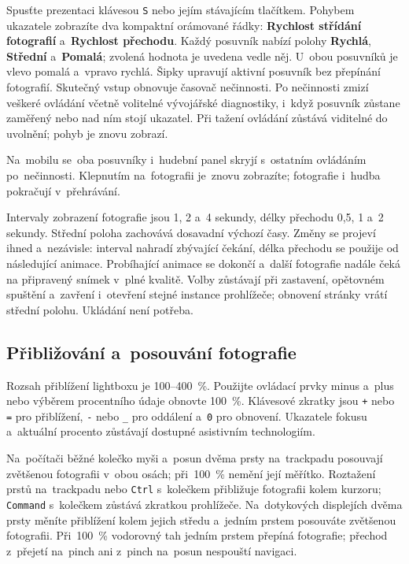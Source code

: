 \documentclass[11pt,a4paper]{article}
\newcommand{\ui}[1]{\textbf{#1}}
\newcommand{\codeword}[1]{\nolinkurl{#1}}
\begin{document}
Spusťte prezentaci klávesou \codeword{S} nebo jejím stávajícím tlačítkem.
Pohybem ukazatele zobrazíte dva kompaktní orámované řádky: \ui{Rychlost střídání
fotografií} a~\ui{Rychlost přechodu}. Každý posuvník nabízí polohy \ui{Rychlá},
\ui{Střední} a~\ui{Pomalá}; zvolená hodnota je uvedena vedle něj. U~obou
posuvníků je vlevo pomalá a~vpravo rychlá. Šipky upravují aktivní posuvník bez
přepínání fotografií. Skutečný vstup obnovuje časovač nečinnosti. Po nečinnosti
zmizí veškeré ovládání včetně volitelné vývojářské diagnostiky, i~když posuvník
zůstane zaměřený nebo nad ním stojí ukazatel. Při tažení ovládání zůstává
viditelné do uvolnění; pohyb je znovu zobrazí.

Na~mobilu se~oba posuvníky i~hudební panel skryjí s~ostatním ovládáním
po~nečinnosti. Klepnutím na~fotografii je~znovu zobrazíte; fotografie i~hudba
pokračují v~přehrávání.

Intervaly zobrazení fotografie jsou 1, 2 a~4 sekundy, délky přechodu 0,5, 1 a~2
sekundy. Střední poloha zachovává dosavadní výchozí časy. Změny se projeví ihned
a~nezávisle: interval nahradí zbývající čekání, délka přechodu se použije od
následující animace. Probíhající animace se dokončí a~další fotografie nadále
čeká na připravený snímek v~plné kvalitě. Volby zůstávají při zastavení,
opětovném spuštění a~zavření i~otevření stejné instance prohlížeče; obnovení
stránky vrátí střední polohu. Ukládání není potřeba.

\subsection{Přibližování a~posouvání fotografie}

Rozsah přiblížení lightboxu je 100--400~\%. Použijte ovládací prvky minus a~plus
nebo výběrem procentního údaje obnovte 100~\%. Klávesové zkratky jsou
\codeword{+} nebo \codeword{=} pro přiblížení, \codeword{-} nebo \codeword{\_}
pro oddálení a~\codeword{0} pro obnovení. Ukazatele fokusu a~aktuální procento
zůstávají dostupné asistivním technologiím.

Na~počítači běžné kolečko myši a~posun dvěma prsty na~trackpadu posouvají
zvětšenou fotografii v~obou osách; při~100~\% nemění její měřítko. Roztažení
prstů na~trackpadu nebo \codeword{Ctrl} s~kolečkem přibližuje fotografii kolem
kurzoru; \codeword{Command} s~kolečkem zůstává zkratkou prohlížeče.
Na~dotykových displejích dvěma prsty měníte přiblížení kolem jejich středu
a~jedním prstem posouváte zvětšenou fotografii. Při~100~\% vodorovný tah jedním
prstem přepíná fotografie; přechod z~přejetí na~pinch ani z~pinch na~posun
nespouští navigaci.
\end{document}
